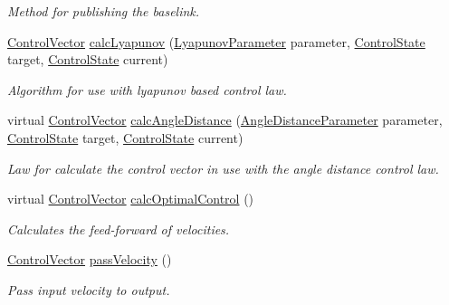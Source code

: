 \begin{DoxyCompactItemize}
\begin{DoxyCompactList}\small\item\em Method for publishing the baselink. \end{DoxyCompactList}\item 
\hyperlink{structController_1_1ControlVector}{Control\+Vector} \hyperlink{classController_a0c8fcf9bb21482d1178d5aa68b8a1fc1}{calc\+Lyapunov} (\hyperlink{structController_1_1LyapunovParameter}{Lyapunov\+Parameter} parameter, \hyperlink{structController_1_1ControlState}{Control\+State} target, \hyperlink{structController_1_1ControlState}{Control\+State} current)
\begin{DoxyCompactList}\small\item\em Algorithm for use with lyapunov based control law. \end{DoxyCompactList}\item 
virtual \hyperlink{structController_1_1ControlVector}{Control\+Vector} \hyperlink{classController_a19dcbffe4b05d8204041cec4bed44fa9}{calc\+Angle\+Distance} (\hyperlink{structController_1_1AngleDistanceParameter}{Angle\+Distance\+Parameter} parameter, \hyperlink{structController_1_1ControlState}{Control\+State} target, \hyperlink{structController_1_1ControlState}{Control\+State} current)
\begin{DoxyCompactList}\small\item\em Law for calculate the control vector in use with the angle distance control law. \end{DoxyCompactList}\item 
virtual \hyperlink{structController_1_1ControlVector}{Control\+Vector} \hyperlink{classController_aacfbe4579c4a50ec84c825bfd12a4a84}{calc\+Optimal\+Control} ()
\begin{DoxyCompactList}\small\item\em Calculates the feed-\/forward of velocities. \end{DoxyCompactList}\item 
\hyperlink{structController_1_1ControlVector}{Control\+Vector} \hyperlink{classController_ab3dcef265387b08402bcafd83bf05e67}{pass\+Velocity} ()
\begin{DoxyCompactList}\small\item\em Pass input velocity to output. \end{DoxyCompactList}\end{DoxyCompactItemize}
